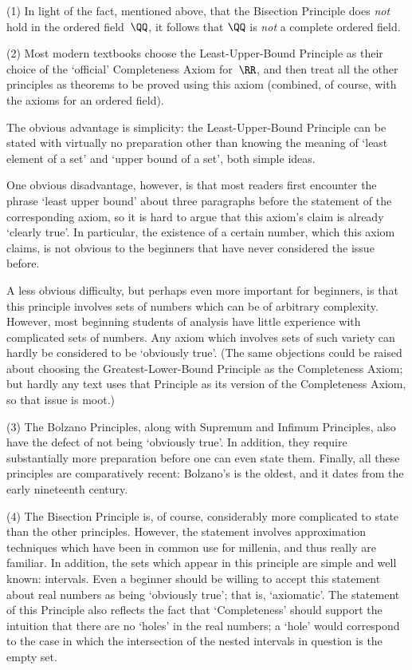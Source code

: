 \V

\hspace*{\parindent} (1) In light of the fact, mentioned above, that the Bisection Principle does {\em not} hold in the ordered field~${\QQ}$,
    it follows that ${\QQ}$ is {\em not} a complete ordered field.

\V

        (2) Most modern textbooks choose the Least-Upper-Bound Principle as their choice of the `official' Completeness Axiom for~${\RR}$,
    and then treat all the other principles as theorems to be proved using this axiom (combined, of course, with the axioms for an ordered field).

        The obvious advantage is simplicity: the Least-Upper-Bound Principle can be stated
    with virtually no preparation other than knowing the meaning of `least element of a set' and `upper bound of a set', both simple ideas.

        One obvious disadvantage, however, is that most readers first encounter the phrase `least upper bound'
    about three paragraphs before the statement of the corresponding axiom, so it is hard to argue that this axiom's claim is already `clearly true'.
    In particular, the existence of a certain number, which this axiom claims, is not obvious to the beginners that have never considered the issue before.

        A less obvious difficulty, but perhaps even more important for beginners,
    is that this principle involves sets of numbers which can be of arbitrary complexity.
    However, most beginning students of analysis have little experience with complicated sets of numbers.
    Any axiom which involves sets of such variety can hardly be considered to be `obviously true'.
    (The same objections could be raised about choosing the Greatest-Lower-Bound  Principle as the Completeness Axiom;
    but hardly any text uses that Principle as its version of the Completeness Axiom, so that issue is moot.)

\V

        (3) The Bolzano Principles, along with Supremum and Infimum Principles, also have the defect of not being `obviously true'.
    In addition, they require substantially more preparation before one can even state them.
    Finally, all these principles are comparatively recent: Bolzano's is the oldest, and it dates from the early nineteenth century.

\V

        (4) The Bisection Principle is, of course, considerably more complicated to state than the other principles.
    However, the statement involves approximation techniques which have been in common use for millenia, and thus really are familiar.
    In addition, the sets which appear in this principle are simple and well known: intervals.
    Even a beginner should be willing to accept this statement about real numbers as being `obviously true'; that is, `axiomatic'.
    The statement of this Principle also reflects the fact that `Completeness' should support the intuition that there are no `holes' in the real numbers;
    a `hole' would correspond to the case in which the intersection of the nested intervals in question is the empty set.

